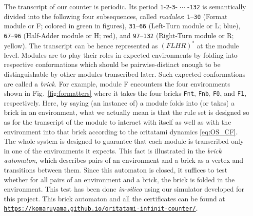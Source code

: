 \documentclass[twocolumn]{svjour3}
\begin{document}


The transcript of our counter is periodic.
Its period \texttt{1}-\texttt{2}-\texttt{3}- $\cdots$ -\texttt{132} is semantically divided into the following four subsequences, called \textit{modules}:
\texttt{1}--\texttt{30} (Format module or F; colored in green in figures),
\texttt{31}--\texttt{66} (Left-Turn module or L; blue),
\texttt{67}--\texttt{96} (Half-Adder module or H; red),
and \texttt{97}--\texttt{132} (Right-Turn module  or R; yellow).
The transcript can be hence represented as $(FLHR)^*$ at the module level. Modules are to play their roles in expected environments by folding into respective conformations which should be pairwise-distinct enough to be distinguishable by other modules transcribed later.
Such expected conformations are called a \textit{brick}.
For example, module F encounters the four environments shown in Fig.~\ref{fig:formatters} where it takes the four bricks \texttt{Fnt}, \texttt{Fnb}, \texttt{F0}, and \texttt{F1}, respectively.
Here, by saying (an instance of) a module folds into (or takes) a brick in an environment, what we actually mean is that the rule set is designed so as for the transcript of the module to interact with itself as well as with the environment into that brick according to the oritatami dynamics  \eqref{eq:OS_CF}.
The whole system is designed to guarantee that each module is transcribed only in one of the environments it expects.
This fact is illustrated in the \textit{brick automaton}, which describes pairs of an environment and a brick as a vertex and transitions between them.
Since this automaton is closed, it suffices to test whether for all pairs of an environment and a brick, the brick is folded in the environment.
This test has been done \textit{in-silico} using our simulator developed for this project.
This brick automaton and all the certificates can be found at \href{https://komaruyama.github.io/oritatami-infinit-counter/}{\texttt{https://komaruyama.github.io/oritatami-infinit-counter/}}.
\end{document}
